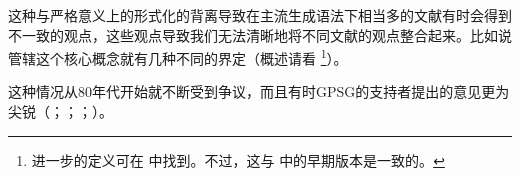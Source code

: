 这种与严格意义上的形式化的背离导致在主流生成语法下相当多的文献有时会得到不一致的观点，这些观点导致我们无法清晰地将不同文献的观点整合起来。比如说管辖这个核心概念就有几种不同的界定（概述请看\citealp{AS83a} \footnote{%
进一步的定义可在  中找到。不过，这与 \citet[--106]{PP86a}中的早期版本是一致的。%
}）。

这种情况从80年代开始就不断受到争议，而且有时GPSG的支持者提出的意见更为尖锐（\citealp*[]{GKPS85a}；\citealp{Pullum85a,Pullum89b}；\citealp[]{Pullum91b}；\citealp{KP90a}）。


